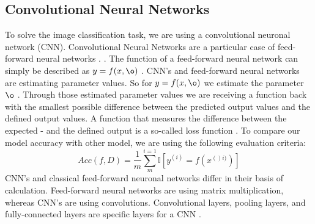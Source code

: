 \documentclass[journal]{IEEEtran}
\begin{document}
\subsection{Convolutional Neural Networks}
\label{subsec:cnn}
\noindent To solve the image classification task, we are using a convolutional neuronal network (CNN). Convolutional Neural Networks are a particular case of feed-forward neural networks \cite{Goodfellow-et-al-2016}. . The function of a feed-forward neural network can simply be described as \(y = f(x, \o )\) . CNN's and feed-forward neural networks are estimating parameter values. So for \(y = f(x, \o )\) we estimate the parameter \(\o \) \cite{Goodfellow-et-al-2016}. Through those estimated parameter values we are receiving a function back with the smallest possible difference between the predicted output values and the defined output values. A function that measures the difference between the expected - and the defined output is a so-called loss function \cite{Goodfellow-et-al-2016}. To compare our model accuracy with other model, we are using the following evaluation criteria:
\begin{equation}
Acc(f,D) = \frac{1}{m}\sum_{m}^{i=1} \mathbb{I} \left [ y^{(i)} =f(x^{()i)})\right ]
\label{acc}
\end{equation}
CNN's and classical feed-forward neuronal networks differ in their basis of calculation. Feed-forward neural networks are using matrix multiplication, whereas CNN's are using convolutions. Convolutional layers, pooling layers, and fully-connected layers are specific layers for a CNN \cite{LeCun1998}. \\
\end{document}
